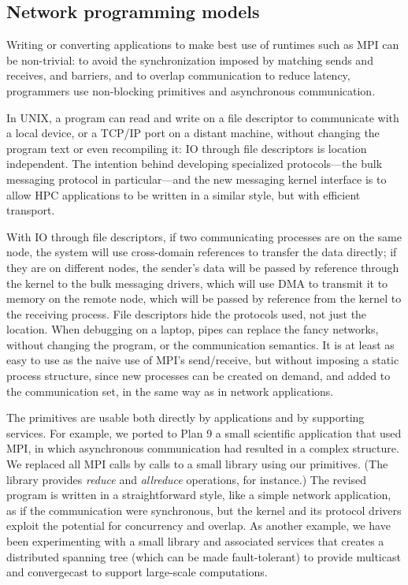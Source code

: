 \subsection{Network programming models}
Writing or converting applications to make best use of runtimes such
as MPI can be non-trivial: to avoid the synchronization imposed by
matching sends and receives, and barriers, and to overlap
communication to reduce latency, programmers use non-blocking
primitives and asynchronous communication.

In UNIX, a program can read and write on a file descriptor to
communicate with a local device, or a TCP/IP port on a distant
machine, without changing the program text or even recompiling it: IO
through file descriptors is location independent.  The intention
behind developing specialized protocols---the bulk messaging protocol
in particular---and the new messaging kernel interface is to allow HPC
applications to be written in a similar style, but with efficient
transport.  

With IO through file descriptors, if two communicating
processes are on the same node, the system will use cross-domain
references to transfer the data directly; if they are on different
nodes, the sender's data will be passed by reference through the
kernel to the bulk messaging drivers, which will use DMA to transmit
it to memory on the remote node, which will be passed by reference
from the kernel to the receiving process.  File descriptors hide the
protocols used, not just the location.  When debugging on a laptop,
pipes can replace the fancy networks, without changing the program, or
the communication semantics.  It is at least as easy to use as the
naive use of MPI's send/receive, but without imposing a static process
structure, since new processes can be created on demand, and added to
the communication set, in the same way as in network applications.

The primitives are usable both directly by applications and by
supporting services.  For example, we ported to Plan 9 a small
scientific application that used MPI, in which asynchronous
communication had resulted in a complex structure.  We replaced all
MPI calls by calls to a small library using our primitives.  (The
library provides \emph{reduce} and \emph{allreduce} operations, for
instance.)  The revised program is written in a straightforward style,
like a simple network application, as if the communication were
synchronous, but the kernel and its protocol drivers exploit
the potential for concurrency and overlap.  As another example, we
have been experimenting with a small library and associated services
that creates a distributed spanning tree (which can be made
fault-tolerant) to provide multicast and convergecast to support
large-scale computations.

